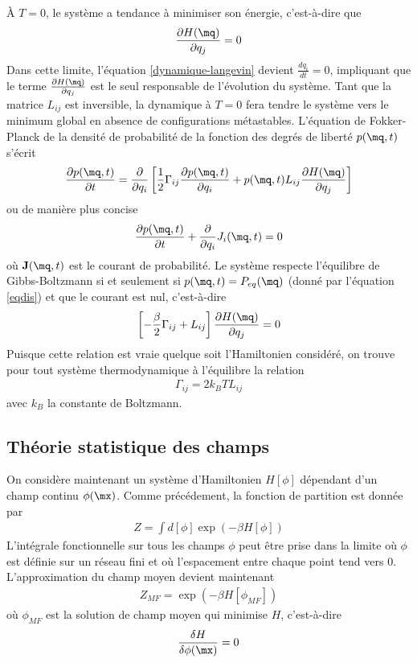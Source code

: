 À $T=0$, le système a tendance à minimiser son énergie, c'est-à-dire que
\begin{align}
    \frac{\partial H(\mq)}{ \partial q_j} = 0
\end{align}
Dans cette limite, l'équation \ref{dynamique-langevin} devient $\frac{d q_i}{dt}=0$, impliquant que le terme $\frac{\partial H(\mq)}{ \partial q_j}$ est le seul responsable de l'évolution du système.
Tant que la matrice $L_{ij}$ est inversible, la dynamique à $T=0$ fera tendre le système vers le minimum global en absence de configurations métastables.
L'équation de Fokker-Planck de la densité de probabilité de la fonction des degrés de liberté $p(\mq,t)$ s'écrit 
\begin{align}
    \frac{\partial p(\mq,t)}{\partial t} = \frac{\partial}{\partial q_i} \left[\frac{1}{2}\Gamma_{ij}                 \frac{\partial p(\mq,t)}{\partial q_i} + p(\mq,t) L_{ij}\frac{\partial H(\mq)}{ \partial q_j}\right]
\end{align}
ou de manière plus concise
\begin{align}
    \frac{\partial p(\mq,t)}{\partial t} +\frac{\partial}{\partial q_i}J_i(\mq,t)=0
    \label{courant}
\end{align}
où  ${\bf J}(\mq,t)$ est le courant de probabilité. Le système respecte l'équilibre de Gibbs-Boltzmann si et seulement si $p(\mq,t)=P_{eq}(\mq)$ (donné par l'équation \ref{eqdis}) et que le courant est nul, c'est-à-dire
\begin{align}
    \left[-\frac{\beta}{2}\Gamma_{ij} + L_{ij}\right]\frac{\partial H(\mq)}{ \partial q_j} = 0
\end{align}
Puisque cette relation est vraie quelque soit l'Hamiltonien considéré, on trouve pour tout système thermodynamique à l'équilibre la relation
\begin{align}
    \Gamma_{ij}= 2 k_B T L_{ij}
\end{align}
avec $k_B$ la constante de Boltzmann.

    \subsection{Théorie statistique des champs}

On considère maintenant un système d'Hamiltonien $H[\phi]$  dépendant d'un champ continu $\phi(\mx)$. Comme précédement, la fonction de partition est donnée par 
\begin{align}
    Z = \int d[\phi] \exp(-\beta H[\phi])
\end{align}
L'intégrale fonctionnelle sur tous les champs $\phi$ peut être prise dans la limite où $\phi$ est définie sur un réseau fini et où l'espacement entre chaque point tend vers $0$.
L'approximation du champ moyen devient maintenant
\begin{align}
    Z _{MF}=  \exp(-\beta H[\phi_{MF}])
\end{align} 
où $\phi_{MF}$ est la solution de champ moyen qui minimise $H$, c'est-à-dire 
\begin{align}
    \frac{\delta H}{\delta\phi(\mx)} = 0
    \label{equi-hamil}
\end{align}

